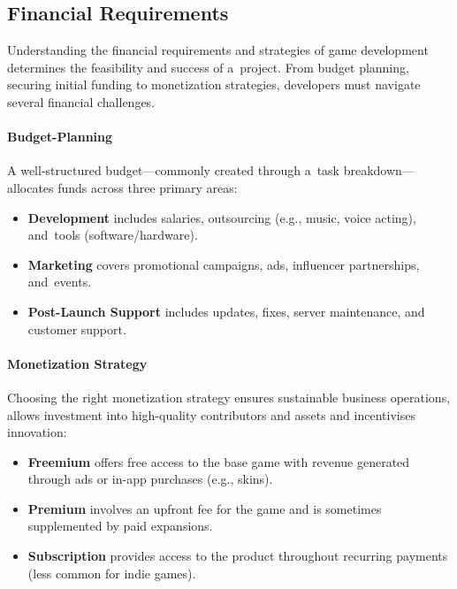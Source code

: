 \subsection{Financial Requirements}
Understanding the financial requirements and strategies of game development determines the feasibility and success of a~project. From budget planning, securing initial funding to monetization strategies, developers must navigate several financial challenges.

\paragraph{Budget-Planning} A well-structured budget---commonly created through a~task breakdown\cite{linkedin_budget}---allocates funds across three primary areas:
\begin{itemize}
	\item \textbf{Development} includes salaries, outsourcing (e.g., music, voice acting), and~tools (software/hardware).\cite{eduonix_costs}
	\item \textbf{Marketing} covers promotional campaigns, ads, influencer partnerships, and~events.\cite{eduonix_costs}
	\item \textbf{Post-Launch Support} includes updates, fixes, server maintenance, and customer support.\cite{eduonix_costs}
\end{itemize}

\paragraph{Monetization Strategy} Choosing the right monetization strategy ensures sustainable business operations, allows investment into high-quality contributors and assets and incentivises innovation:
\begin{itemize}
	\item \textbf{Freemium} offers free access to the base game with revenue generated through ads or in-app purchases (e.g., skins).\cite{hubka_game-monetization}
	\item \textbf{Premium} involves an upfront fee for the game and is sometimes supplemented by paid expansions.\cite{hubka_game-monetization}
	\item \textbf{Subscription} provides access to the product throughout recurring payments (less common for indie games).\cite{hubka_game-monetization}
\end{itemize}

